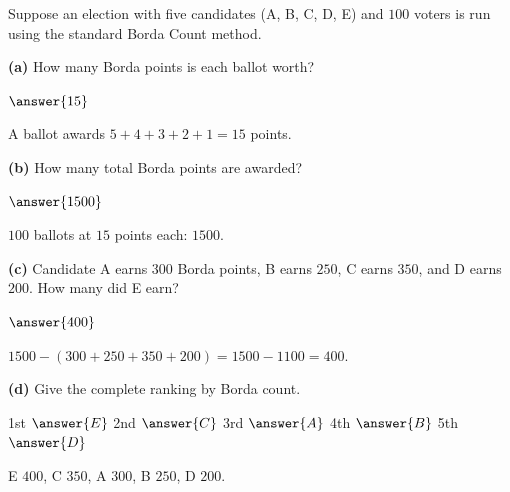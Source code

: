 \documentclass[12pt]{ximera}
\begin{document}
\begin{problem}
Suppose an election with five candidates (A, B, C, D, E) and $100$ voters is run using
the standard Borda Count method.

\begin{prompt}
\textbf{(a)} How many Borda points is each ballot worth?

$\answer{15}$

\begin{feedback}
A ballot awards $5+4+3+2+1=15$ points.
\end{feedback}
\end{prompt}

\begin{prompt}
\textbf{(b)} How many total Borda points are awarded?

$\answer{1500}$

\begin{feedback}
$100$ ballots at $15$ points each: $1500$.
\end{feedback}
\end{prompt}

\begin{prompt}
\textbf{(c)} Candidate A earns $300$ Borda points, B earns $250$, C earns $350$, and D
earns $200$. How many did E earn?

$\answer{400}$

\begin{feedback}
$1500-(300+250+350+200)=1500-1100=400$.
\end{feedback}
\end{prompt}

\begin{prompt}
\textbf{(d)} Give the complete ranking by Borda count.

1st $\answer{E}$ \quad 2nd $\answer{C}$ \quad 3rd $\answer{A}$ \quad 4th $\answer{B}$
\quad 5th $\answer{D}$

\begin{feedback}
E $400$, C $350$, A $300$, B $250$, D $200$.
\end{feedback}
\end{prompt}
\end{problem}
\end{document}
